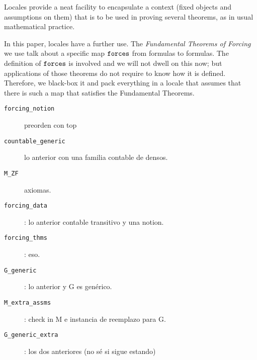 Locales \cite{ballarin2010tutorial} provide a neat facility to
encapsulate a context (fixed objects and assumptions on them) that is
to be used in proving several theorems, as in usual mathematical
practice. 

In this paper, locales have a further use. The \emph{Fundamental
  Theorems of Forcing} we use talk about a specific map $\mathop{\mathtt{forces}}$
from formulas to formulas. The definition of $\mathop{\mathtt{forces}}$ is involved
and we will not dwell on this now; but applications of those theorems
do not require to know how it is defined. Therefore, we black-box it
and pack everything in a locale that assumes that there is such a
map that satisfies the Fundamental Theorems.

\begin{description}
\item[\texttt{forcing\_notion}] preorden con top
\item[\texttt{countable\_generic}] lo anterior con una familia contable de densos.
\item[\texttt{M\_ZF}] axiomas.
\item[\texttt{forcing\_data}]: lo anterior contable transitivo y una notion.
\item[\texttt{forcing\_thms}]: eso.
\item[\texttt{G\_generic}]: lo anterior y G es genérico.
\item[\texttt{M\_extra\_assms}]: check in M e instancia de reemplazo para G.
\item[\texttt{G\_generic\_extra}]: los dos anteriores (no sé si sigue estando)
\end{description}


